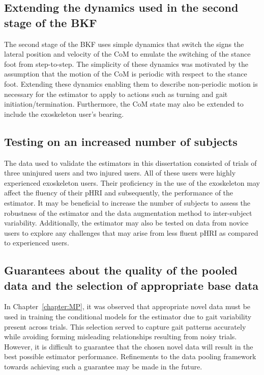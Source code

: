 \subsection{Extending the dynamics used in the second stage of the BKF}

The second stage of the BKF uses simple dynamics that switch the signs the lateral position and velocity of the CoM to emulate the switching of the stance foot from step-to-step. The simplicity of these dynamics was motivated by the assumption that the motion of the CoM is periodic with respect to the stance foot. Extending these dynamics enabling them to describe non-periodic motion is necessary for the estimator to apply to actions such as turning and gait initiation/termination. Furthermore, the CoM state may also be extended to include the exoskeleton user's bearing.

\subsection{Testing on an increased number of subjects}

The data used to validate the estimators in this dissertation consisted of trials of three uninjured users and two injured users. All of these users were highly experienced exoskeleton users. Their proficiency in the use of the exoskeleton may affect the fluency of their pHRI and subsequently, the performance of the estimator. It may be beneficial to increase the number of subjects to assess the robustness of the estimator and the data augmentation method to inter-subject variability. Additionally, the estimator may also be tested on data from novice users to explore any challenges that may arise from less fluent pHRI as compared to experienced users.

\subsection{Guarantees about the quality of the pooled data and the selection of appropriate base data}

In Chapter~\ref{chapter:MP}, it was observed that appropriate novel data must be used in training the conditional models for the estimator due to gait variability present across trials. This selection served to capture gait patterns accurately while avoiding forming misleading relationships resulting from noisy trials. However, it is difficult to guarantee that the chosen novel data will result in the best possible estimator performance. Refinements to the data pooling framework towards achieving such a guarantee may be made in the future.


